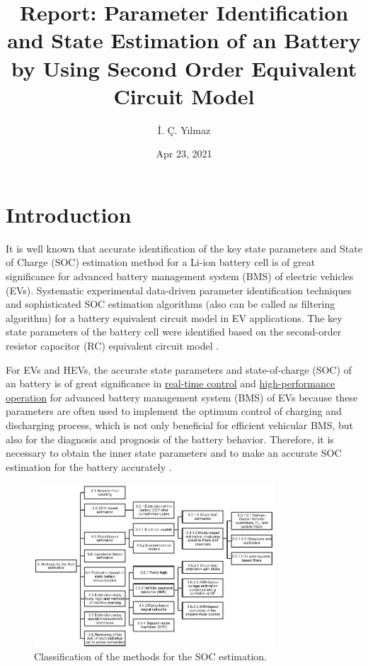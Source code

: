 \documentclass[12pt]{article}
\title{Report: Parameter Identification and State Estimation of an Battery by Using Second Order Equivalent Circuit Model}
\author{İ. Ç. Yılmaz}
\date{Apr 23, 2021}
\begin{document}
\maketitle%

\section{Introduction} \label{Introduction}
\par It is well known that accurate identification of the key state parameters and State of Charge (SOC) estimation method for a Li-ion battery cell is of great significance for advanced battery management system (BMS) of electric vehicles (EVs). Systematic experimental data-driven parameter identification techniques and sophisticated SOC estimation algorithms (also can be called as filtering algorithm) for a battery equivalent circuit model in EV applications. The key state parameters of the battery cell were identified based on the second-order resistor capacitor (RC) equivalent circuit model \cite{Pang2018}. \newline

\par \noindent For EVs and HEVs, the accurate state parameters and state-of-charge (SOC) of an battery is of great significance in \underline{real-time control} and \underline{high-performance operation} for advanced battery management system (BMS) of EVs because these parameters are often used to implement the optimum control of charging and discharging process, which is not only beneficial for efficient vehicular BMS, but also for the diagnosis and prognosis of the battery behavior. Therefore, it is necessary to obtain the inner state
parameters and to make an accurate SOC estimation for the battery accurately \cite{Pang2018}.\newline

\begin{figure}[t!]
	\centering
	\includegraphics[width=0.80\textwidth, keepaspectratio]{images/Classification_of_the_methods_for_the_SoC_estimation.pdf}
	\caption{Classification of the methods for the SOC estimation. \cite{WaaG2014}}
	\label{fig:Classification_of_the_methods_for_the_SOC_estimation}
\end{figure}
\end{document}
